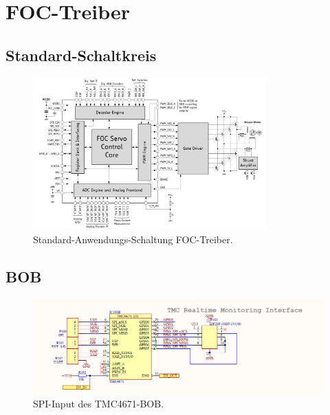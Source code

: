 \section{FOC-Treiber}\label{Appendix:TMC4671}

\subsection{Standard-Schaltkreis}\label{Appendix:Schaltung_TMC4671}

\begin{figure}[H]
	\centering
	\includegraphics[width=0.8\textwidth]{graphics/Standard_Application_Cirquit_TMC4671}
	\caption{Standard-Anwendungs-Schaltung FOC-Treiber. \cite[S.138]{trinamicmotion_control_gmbh__co_kg_tmc4671_2019}}
	\label{fig:Schaltung_TMC4671}
\end{figure}

\subsection{BOB}\label{Appendix:BOB}

\begin{figure}[H]
	\centering
	\includegraphics[width=\textwidth]{graphics/TMC4671_SPI_BOB_Schematic}
	\caption{SPI-Input des TMC4671-BOB. \cite[S.2]{trinamicmotion_control_gmbh__co_kg_tmc4671-bob_2020}}
	\label{fig:Schema_SPI_FOC_Treiber}
\end{figure} 

